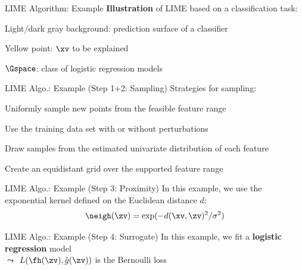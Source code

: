 \documentclass[10pt,compress,t,notes=noshow, xcolor=table]{beamer}
\newcommand{\gh}{\hat{g}}
\begin{document}
\begin{framev}[align=top]{LIME Algorithm: Example}
\textbf{Illustration} of LIME based on a classification task:
\begin{itemizeM}
\item Light/dark gray background: prediction surface of a classifier
\item Yellow point: $\xv$ to be explained
\item $\Gspace$: class of logistic regression models
\end{itemizeM}
\end{framev}


\begin{framev}[align=top]{LIME Algo.: Example (Step 1+2: Sampling)}
Strategies for sampling:
\begin{itemizeM}
\item Uniformly sample new points from the feasible feature range
\item Use the training data set with or without perturbations
\item Draw samples from the estimated univariate distribution of each feature
\item Create an equidistant grid over the supported feature range
\end{itemizeM}
\end{framev}


\begin{framev}[align=top]{LIME Algo.: Example (Step 3: Proximity)}
In this example, we use the exponential kernel defined on the Euclidean distance $d$:
$$
\neigh(\zv) = \exp(-d(\xv, \zv)^2 / \sigma^2)
$$


\end{framev}


\begin{framev}[align=top]{LIME Algo.: Example (Step 4: Surrogate)}
In this example, we fit a \textbf{logistic regression} model\\
$\leadsto$ $L(\fh(\zv), \gh(\zv))$ is the Bernoulli loss
\end{framev}

\endlecture
\end{document}
